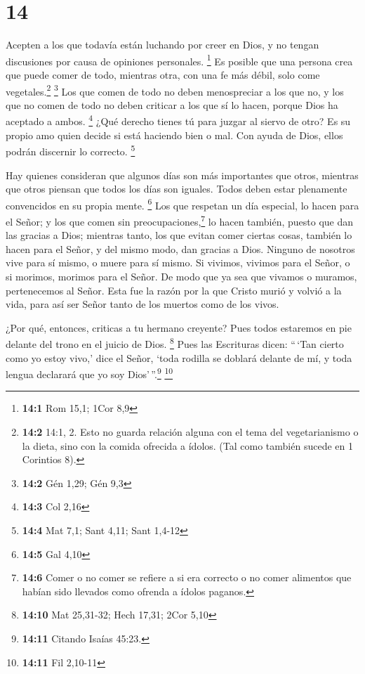 \hypertarget{section-13}{%
\section{14}\label{section-13}}

 Acepten a los que todavía están luchando por creer en
Dios, y no tengan discusiones por causa de opiniones personales.
\footnote{\textbf{14:1} Rom 15,1; 1Cor 8,9}  Es posible
que una persona crea que puede comer de todo, mientras otra, con una fe
más débil, solo come vegetales.\footnote{\textbf{14:2} 14:1, 2. Esto no
  guarda relación alguna con el tema del vegetarianismo o la dieta, sino
  con la comida ofrecida a ídolos. (Tal como también sucede en 1
  Corintios 8).} \footnote{\textbf{14:2} Gén 1,29; Gén 9,3}
 Los que comen de todo no deben menospreciar a los que no,
y los que no comen de todo no deben criticar a los que sí lo hacen,
porque Dios ha aceptado a ambos. \footnote{\textbf{14:3} Col 2,16}
 ¿Qué derecho tienes tú para juzgar al siervo de otro? Es
su propio amo quien decide si está haciendo bien o mal. Con ayuda de
Dios, ellos podrán discernir lo correcto. \footnote{\textbf{14:4} Mat
  7,1; Sant 4,11; Sant 1,4-12}

 Hay quienes consideran que algunos días son más
importantes que otros, mientras que otros piensan que todos los días son
iguales. Todos deben estar plenamente convencidos en su propia mente.
\footnote{\textbf{14:5} Gal 4,10}  Los que respetan un día
especial, lo hacen para el Señor; y los que comen sin
preocupaciones,\footnote{\textbf{14:6} Comer o no comer se refiere a si
  era correcto o no comer alimentos que habían sido llevados como
  ofrenda a ídolos paganos.} lo hacen también, puesto que dan las
gracias a Dios; mientras tanto, los que evitan comer ciertas cosas,
también lo hacen para el Señor, y del mismo modo, dan gracias a Dios.
 Ninguno de nosotros vive para sí mismo, o muere para sí
mismo.  Si vivimos, vivimos para el Señor, o si morimos,
morimos para el Señor. De modo que ya sea que vivamos o muramos,
pertenecemos al Señor.  Esta fue la razón por la que
Cristo murió y volvió a la vida, para así ser Señor tanto de los muertos
como de los vivos.

 ¿Por qué, entonces, criticas a tu hermano creyente? Pues
todos estaremos en pie delante del trono en el juicio de Dios.
\footnote{\textbf{14:10} Mat 25,31-32; Hech 17,31; 2Cor 5,10}
 Pues las Escrituras dicen: ``\,`Tan cierto como yo estoy
vivo,' dice el Señor, `toda rodilla se doblará delante de mí, y toda
lengua declarará que yo soy Dios'\,''.\footnote{\textbf{14:11} Citando
  Isaías 45:23.} \footnote{\textbf{14:11} Fil 2,10-11}

